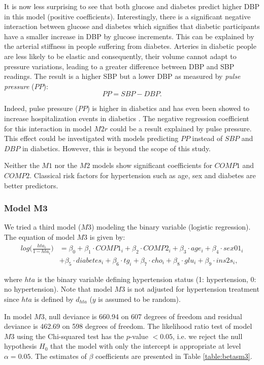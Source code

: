 It is now less surprising to see that both glucose and diabetes predict higher DBP in this model (positive coefficients). Interestingly, there is a significant negative interaction between glucose and diabetes which signifies that diabetic participants have a smaller increase in DBP by glucose increments. This can be explained by the arterial stiffness in people suffering from diabetes. Arteries in diabetic people are less likely to be elastic and consequently, their volume cannot adapt to pressure variations, leading to a greater difference between DBP and SBP readings. The result is a higher SBP but a lower DBP as measured by \emph{pulse pressure} ($PP$):
\begin{equation*}
PP=SBP-DBP.
\end{equation*}

Indeed, pulse pressure ($PP$) is higher in diabetics and has even been showed to increase hospitalization events in diabetics \cite{yu_association_2015}. The negative regression coefficient for this interaction in model $M2r$ could be a result explained by pulse pressure. This effect could be investigated with models predicting $PP$ instead of $SBP$ and $DBP$ in diabetics. However, this is beyond the scope of this study.

Neither the $M1$ nor the $M2$ models show significant coefficients for $COMP1$ and $COMP2$. Classical risk factors for hypertension such as age, sex and diabetes are better predictors.

\subsubsection{Model M3}
We tried a third model ($M3$) modeling the binary variable (logistic regression). The equation of model $M3$ is given by:
\begin{align*}
log \Bigg (\frac{hta_i}{1-hta_i} \Bigg ) &=  \beta_0 + \beta_1 \cdot COMP1_i+ \beta_2 \cdot COMP2_i + \beta_3 \cdot age_i + \beta_4 \cdot sex01_i  \\
& +\beta_5 \cdot diabetes_i +\beta_6 \cdot tg_i +\beta_7 \cdot cho_i +\beta_8 \cdot glu_i +\beta_9 \cdot ins2s_i,
\end{align*}

where $hta$ is the binary variable defining hypertension status (1: hypertension, 0: no hypertension). Note that model $M3$ is not adjusted for hypertension treatment since $hta$ is defined by $d_{hta}$ ($y$ is assumed to be random).

In model $M3$, null deviance is 660.94 on 607 degrees of freedom and residual deviance is 462.69 on 598 degrees of freedom. The likelihood ratio test of model $M3$ using the Chi-squared test has the $p$-value $<0.05$, i.e. we reject the null hypothesis $H_0$ that the model with only the intercept is appropriate at level $\alpha=0.05$. The estimates of $\beta$ coefficients are presented in Table \ref{table:betasm3}.

